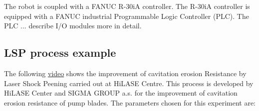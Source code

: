 The robot is coupled with a FANUC R-30iA controller. The R-30iA controller is equipped with a FANUC industrial Programmable Logic Controller (PLC). The PLC ... describe I/O modules more in detail. 

\subsection{LSP process example}

The following \href{https://www.youtube.com/watch?v=awhlLU91-dk&ab_channel=HiLASECentre}{video} shows the improvement of cavitation erosion Resistance by Laser Shock Peening carried out at HiLASE Centre. This process is developed by HiLASE Center and SIGMA GROUP a.s. for the improvement of cavitation erosion resistance of pump blades. The parameters chosen for this experiment are:


